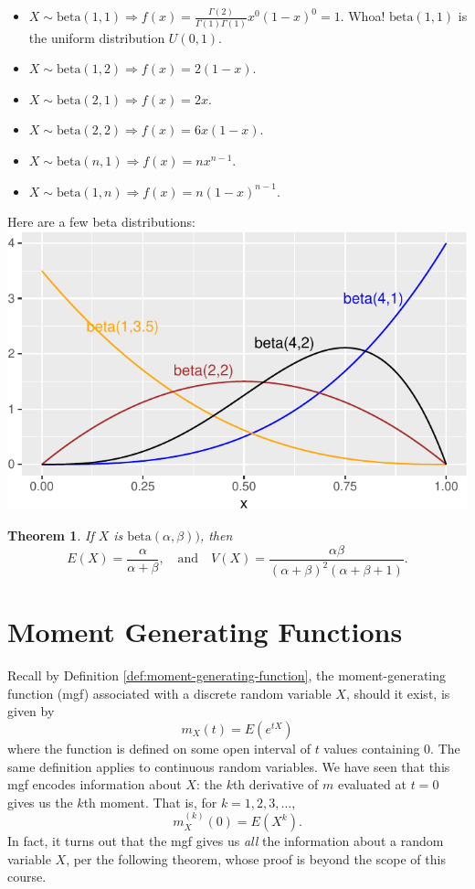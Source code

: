 \documentclass[
]{book}
\providecommand{\tightlist}{%
  \setlength{\itemsep}{0pt}\setlength{\parskip}{0pt}}
\newtheorem{theorem}{Theorem}[chapter]
\theoremstyle{definition}
\theoremstyle{definition}
\theoremstyle{definition}
\theoremstyle{definition}
\theoremstyle{remark}
\begin{document}
\begin{itemize}
\tightlist
\item
  \(\displaystyle X \sim \text{beta}(1,1) \Rightarrow f(x) = \frac{\Gamma(2)}{\Gamma(1)\Gamma(1)}x^0(1-x)^0 = 1\). Whoa! \(\text{beta}(1,1)\) is the uniform distribution \(U(0,1).\)
\item
  \(\displaystyle X \sim \text{beta}(1,2) \Rightarrow f(x) = 2(1-x)\).
\item
  \(\displaystyle X \sim \text{beta}(2,1) \Rightarrow f(x) = 2x\).
\item
  \(\displaystyle X \sim \text{beta}(2,2) \Rightarrow f(x) = 6x(1-x)\).
\item
  \(\displaystyle X \sim \text{beta}(n,1) \Rightarrow f(x) = nx^{n-1}\).
\item
  \(\displaystyle X \sim \text{beta}(1,n) \Rightarrow f(x) = n(1-x)^{n-1}\).
\end{itemize}

Here are a few beta distributions:
\includegraphics{math340-notes_files/figure-latex/unnamed-chunk-24-1.pdf}

\begin{theorem}
\protect\hypertarget{thm:beta-EandV}{}\label{thm:beta-EandV}If \(X\) is \(\text{beta}(\alpha,\beta))\), then \[E(X) = \frac{\alpha}{\alpha+\beta}, ~~~ \text{ and } ~~~ V(X) = \frac{\alpha\beta}{(\alpha+\beta)^2(\alpha+\beta+1)}.\]
\end{theorem}

\chapter{Moment Generating Functions}\label{mgf}

Recall by Definition \ref{def:moment-generating-function}, the moment-generating function (mgf) associated with a discrete random variable \(X\), should it exist, is given by \[m_X(t) = E(e^{tX})\] where the function is defined on some open interval of \(t\) values containing 0. The same definition applies to continuous random variables. We have seen that this mgf encodes information about \(X\): the \(k\)th derivative of \(m\) evaluated at \(t = 0\) gives us the \(k\)th moment. That is, for \(k = 1,2,3,\ldots\),
\[m_X^{(k)}(0) = E(X^k).\]
In fact, it turns out that the mgf gives us \emph{all} the information about a random variable \(X\), per the following theorem, whose proof is beyond the scope of this course.
\end{document}
